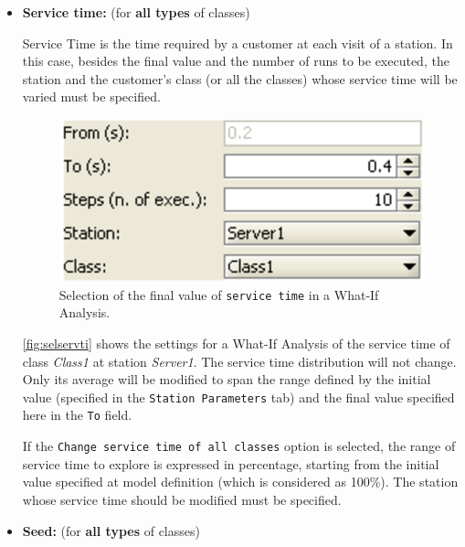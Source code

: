 \begin{itemize}
\item \textbf{Service time:} (for \textbf{all types} of classes)

Service Time is the time required by a customer at each visit of a
station. In this case, besides the final value and the number of
runs to be executed, the station and the customer's class (or all
the classes) whose service time will be varied must be specified.
\begin{figure}[hbt]
    \begin{center}
        \includegraphics[scale=.5]{img/jsimg/7.6.eps}
    \end{center}
    \caption{Selection of the final value of \texttt{service time}
    in a What-If Analysis.}
    \label{fig:selservti}
\end{figure}
\autoref{fig:selservti} shows the settings for a What-If
Analysis of the service time of class \emph{Class1} at station
\emph{Server1}. The service time distribution will not change.
Only its average will be modified to span the range defined by the
initial value (specified in the \texttt{Station Parameters} tab)
and the final value specified here in the \texttt{To} field.

If the \texttt{Change service time of all classes} option is
selected, the range of service time to explore is expressed in
percentage, starting from the initial value specified at model
definition (which is considered as 100\%). The station whose
service time should be modified must be specified.

\item \textbf{Seed:} (for \textbf{all types} of classes)


\end{itemize}
